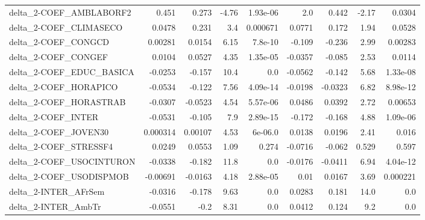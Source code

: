 \begin{tabular}{lrrrrrrrr}
delta\_2-COEF\_AMBLABORF2               &       0.451 &        0.273 &    -4.76 & 1.93e-06 &        2.0 &       0.442 &        -2.17 &        0.0304 \\
delta\_2-COEF\_CLIMASECO                &      0.0478 &        0.231 &      3.4 & 0.000671 &     0.0771 &       0.172 &         1.94 &        0.0528 \\
delta\_2-COEF\_CONGCD                   &     0.00281 &       0.0154 &     6.15 &  7.8e-10 &     -0.109 &      -0.236 &         2.99 &       0.00283 \\
delta\_2-COEF\_CONGEF                   &      0.0104 &       0.0527 &     4.35 & 1.35e-05 &    -0.0357 &      -0.085 &         2.53 &        0.0114 \\
delta\_2-COEF\_EDUC\_BASICA              &     -0.0253 &       -0.157 &     10.4 &      0.0 &    -0.0562 &      -0.142 &         5.68 &      1.33e-08 \\
delta\_2-COEF\_HORAPICO                 &     -0.0534 &       -0.122 &     7.56 & 4.09e-14 &    -0.0198 &     -0.0323 &         6.82 &      8.98e-12 \\
delta\_2-COEF\_HORASTRAB                &     -0.0307 &      -0.0523 &     4.54 & 5.57e-06 &     0.0486 &      0.0392 &         2.72 &       0.00653 \\
delta\_2-COEF\_INTER                    &     -0.0531 &       -0.105 &      7.9 & 2.89e-15 &     -0.172 &      -0.168 &         4.88 &      1.09e-06 \\
delta\_2-COEF\_JOVEN30                  &    0.000314 &      0.00107 &     4.53 &  6e-06.0 &     0.0138 &      0.0196 &         2.41 &         0.016 \\
delta\_2-COEF\_STRESSF4                 &      0.0249 &       0.0553 &     1.09 &    0.274 &    -0.0716 &      -0.062 &        0.529 &         0.597 \\
delta\_2-COEF\_USOCINTURON              &     -0.0338 &       -0.182 &     11.8 &      0.0 &    -0.0176 &     -0.0411 &         6.94 &      4.04e-12 \\
delta\_2-COEF\_USODISPMOB               &    -0.00691 &      -0.0163 &     4.18 & 2.88e-05 &       0.01 &      0.0167 &         3.69 &      0.000221 \\
delta\_2-INTER\_AFrSem                  &     -0.0316 &       -0.178 &     9.63 &      0.0 &     0.0283 &       0.181 &         14.0 &           0.0 \\
delta\_2-INTER\_AmbTr                   &     -0.0551 &         -0.2 &     8.31 &      0.0 &     0.0412 &       0.124 &          9.2 &           0.0 \\

\end{tabular}
